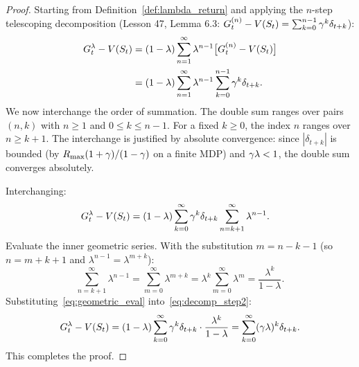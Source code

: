 \documentclass[11pt,a4paper]{article}
\begin{document}
\begin{proof}
Starting from Definition~\ref{def:lambda_return} and applying the
$n$-step telescoping decomposition (Lesson 47, Lemma 6.3:
$G_t^{(n)} - V(S_t) = \sum_{k=0}^{n-1} \gamma^k \delta_{t+k}$):
\begin{align}
  G_t^\lambda - V(S_t)
  &= (1 - \lambda) \sum_{n=1}^{\infty} \lambda^{n-1}
     \bigl[G_t^{(n)} - V(S_t)\bigr] \nonumber\\
  &= (1 - \lambda) \sum_{n=1}^{\infty} \lambda^{n-1}
     \sum_{k=0}^{n-1} \gamma^k \delta_{t+k}.
  \label{eq:decomp_step1}
\end{align}
We now interchange the order of summation. The double sum ranges over
pairs $(n, k)$ with $n \geq 1$ and $0 \leq k \leq n - 1$. For a
fixed $k \geq 0$, the index $n$ ranges over $n \geq k + 1$. The
interchange is justified by absolute convergence: since
$|\delta_{t+k}|$ is bounded (by $R_{\max}(1 + \gamma)/(1-\gamma)$
on a finite MDP) and $\gamma\lambda < 1$, the double sum converges
absolutely.

Interchanging:
\begin{align}
  G_t^\lambda - V(S_t)
  &= (1 - \lambda) \sum_{k=0}^{\infty} \gamma^k \delta_{t+k}
     \sum_{n=k+1}^{\infty} \lambda^{n-1}.
  \label{eq:decomp_step2}
\end{align}
Evaluate the inner geometric series. With the substitution $m = n - k - 1$
(so $n = m + k + 1$ and $\lambda^{n-1} = \lambda^{m+k}$):
\begin{equation}
  \sum_{n=k+1}^{\infty} \lambda^{n-1}
  = \sum_{m=0}^{\infty} \lambda^{m+k}
  = \lambda^k \sum_{m=0}^{\infty} \lambda^m
  = \frac{\lambda^k}{1 - \lambda}.
  \label{eq:geometric_eval}
\end{equation}
Substituting~\eqref{eq:geometric_eval}
into~\eqref{eq:decomp_step2}:
\begin{equation}
  G_t^\lambda - V(S_t)
  = (1 - \lambda) \sum_{k=0}^{\infty} \gamma^k \delta_{t+k}
    \cdot \frac{\lambda^k}{1 - \lambda}
  = \sum_{k=0}^{\infty} (\gamma\lambda)^k \delta_{t+k}.
  \label{eq:decomp_final}
\end{equation}
This completes the proof.
\end{proof}
\end{document}
